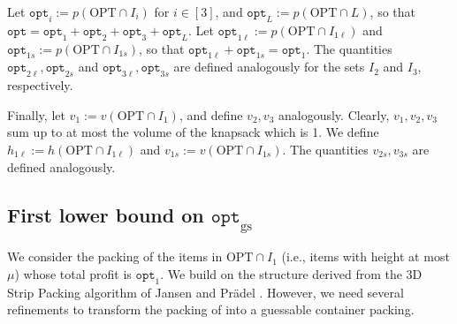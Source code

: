 \documentclass[10pt,a4paper]{amsart}
\newcommand{\ari}[1]{#1}
\newcommand{\akr}[1]{}
\renewcommand{\epsilon}{\varepsilon} %
\newtheorem{lemma}[theorem]{Lemma}
\theoremstyle{definition}
\newcommand{\opt}{\mathtt{opt}}
\newcommand{\optgs}{\mathtt{opt}_{\mathrm{gs}}}
\newcommand{\optonel}{\mathtt{opt}_{1\ell}}
\newcommand{\optones}{\mathtt{opt}_{1s}}
\newcommand{\opttwol}{\mathtt{opt}_{2\ell}}
\newcommand{\opttwos}{\mathtt{opt}_{2s}}
\newcommand{\optthreel}{\mathtt{opt}_{3\ell}}
\newcommand{\optthrees}{\mathtt{opt}_{3s}}
\newcommand{\honel}{h_{1\ell}}
\newcommand{\vones}{v_{1s}}
\newcommand{\vtwos}{v_{2s}}
\newcommand{\vthrees}{v_{3s}}
\begin{document}
Let $\opt_i := p(\text{OPT}\cap I_i)$ for $i\in [3]$, and $\opt_L := p(\text{OPT}\cap L)$, so that $\opt = \opt_1+\opt_2+\opt_3+\opt_L$.
Let $\optonel := p(\text{OPT}\cap I_{1\ell})$ and $\optones := p(\text{OPT}\cap I_{1s})$, so that $\optonel+\optones=\opt_1$. The quantities $\opttwol, \opttwos$ and $\optthreel, \optthrees$ are defined analogously for the sets $I_2$ and $I_3$, respectively.

Finally, let $v_1 := v(\text{OPT}\cap I_1)$, and define $v_2, v_3$ analogously.  Clearly, $v_1, v_2, v_3$ sum up to at most the volume of the knapsack which is 1. We define $\honel := h(\text{OPT}\cap I_{1\ell})$ and $\vones := v(\text{OPT}\cap I_{1s})$. The quantities $\vtwos,\vthrees$ are defined analogously.



\subsection{First lower bound on \texorpdfstring{$\optgs$}{optgs}}
\label{sec:firstlb}
We consider the packing of the items in $\text{OPT}\cap I_1$ (i.e., items with height at most $\mu$) whose total profit is $\opt_1$. We build on the structure derived from the 3D Strip Packing algorithm of Jansen and Pr{\"a}del \cite{3d-strip-packing}. 
However, 
we need several refinements to transform the packing of \cite{3d-strip-packing} into a guessable container packing. 


\end{document}
